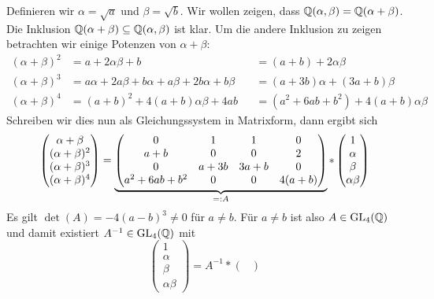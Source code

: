 \begin{exercisePage}
	Definieren wir $\alpha = \sqrt{a}$ und $\beta = \sqrt{b}$. Wir wollen zeigen, dass $\mathbb{Q}(\alpha, \beta) = \mathbb{Q}(\alpha + \beta)$. Die Inklusion $\mathbb{Q}(\alpha + \beta) \subseteq \mathbb{Q}(\alpha , \beta)$ ist klar. Um die andere Inklusion zu zeigen betrachten wir einige Potenzen von $\alpha + \beta$:
	\begin{equation*}
		\begin{alignedat}{2}
			(\alpha + \beta)^2 &= a + 2 \alpha \beta + b &&= (a+b) + 2 \alpha \beta \\
			(\alpha + \beta)^3 &= a \alpha + 2a \beta + b \alpha + a \beta + 2b \alpha + b \beta &&= (a+3b) \alpha + (3a + b) \beta \\
			(\alpha + \beta)^4 &= (a+b)^2 + 4(a+b) \alpha \beta + 4ab &&= (a^2 + 6ab + b^2) + 4(a+b) \alpha \beta
		\end{alignedat}
	\end{equation*} 
	Schreiben wir dies nun als Gleichungssystem in Matrixform, dann ergibt sich
	\begin{equation*}
		\begin{pmatrix} 
			\alpha + \beta \\ (\alpha + \beta)^2 \\ (\alpha + \beta)^3 \\ (\alpha + \beta)^4
		\end{pmatrix}
		= \underbrace{\begin{pmatrix}
			0               & 1    & 1    & 0      \\
			a+b             & 0    & 0    & 2      \\
			0               & a+3b & 3a+b & 0      \\
			a^2 + 6ab + b^2 & 0    & 0    & 4(a+b)
		\end{pmatrix}}_{\mathrel{=:} A}
		* \begin{pmatrix}
		1 \\ \alpha \\ \beta \\ \alpha \beta
		\end{pmatrix}
	\end{equation*}
	Es gilt $\det(A) = -4 (a-b)^3 \neq 0$ für $a \neq b$. Für $a \neq b$ ist also $A \in \operatorname{GL}_4(\mathbb{Q})$ und damit existiert $A^{-1} \in \operatorname{GL}_4(\mathbb{Q})$ mit 
	\begin{equation*}
		\begin{pmatrix}
		1 \\ \alpha \\ \beta \\ \alpha \beta
		\end{pmatrix} = A^{-1} * \begin{pmatrix} 

\end{pmatrix}
\end{equation*}
\end{exercisePage}

